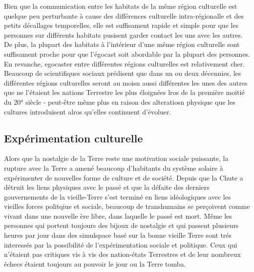 Bien que la communication entre les habitats de la même région culturelle est quelque peu perturbante à cause des différences culturelle intra-régionalle et des petits décallages temporelles, elle est suffisament rapide et simple pour que les personnes sur différents habitats pusisent garder contact les uns avec les autres. De plus, la plupart des habitats à l'intérieur d'une même région culturelle sont suffisament proche pour que l'égocast soit abordable par la plupart des personnes. En revanche, egocaster entre différentes régions culturelles est relativement cher. Beaucoup de scientifiques sociaux prédisent que dans un ou deux décennies, les différentes régions culturelles seront au moisn aussi différentes les unes des autres que ne l'étaient les nations Terrestre les plus éloignées lros de la première moitié du 20° siècle - peut-être même plus en raison des alteratiosn physique que les cultures introduisent alros qu'elles continuent d'évoluer. 

\subsection{Expérimentation culturelle} \label{sec:cult-exper} 

Alors que la nostalgie de la Terre reste une motivation sociale puissante, la rupture avec la Terre a amené beaucoup d'habitants du système solaire à expérimenter de nouvelles forme de culture et de société. Depuis que la Chute a détruit les liens physiques avec le passé et que la défaite des derniers gouvernements de la vieille-Terre s'est terminé en liens idéologiques avec les vieilles forces politqiue et sociale, beaucoup de transhumains se perçoivent comme vivant dans une nouvelle ère libre, dans laquelle le passé est mort. Même les personnes qui portent toujours des bijoux de nostalgie et qui passent plusieurs heures par jour dans des simulspace basé sur la bonne vieille Terre sont trés interessés par la possibilité de l'expérimentation sociale et politique. Ceux qui n'étaient pas critiques vis à vis des nation-états Terrestres et de leur nombreux échecs étaient toujours au pouvoir le jour ou la Terre tomba. 

